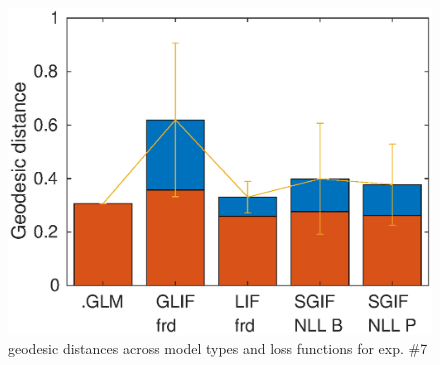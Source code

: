\documentclass[mphil,deptreport,ianc]{infthesis} %
\begin{document}
\begin{figure}
    \centering
    \includegraphics[width=0.65\columnwidth]{figures/sleep/geodesic_exp147.eps}
    \caption{geodesic distances across model types and loss functions for exp. \#7}
    \label{fig:geodesic_distances_exp7}
\end{figure}
\end{document}
